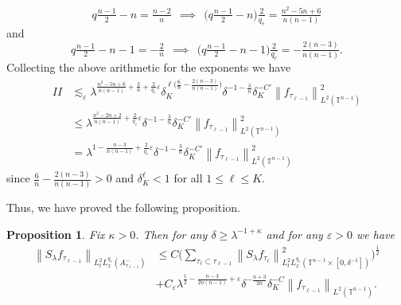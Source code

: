 \documentclass[11pt]{amsart}
\numberwithin{equation}{section}
\newcommand{\Tn}{\mathbb{T}^{n-1}}
\newcommand{\la}{\lambda}
\newcommand\norm[1]{\left\lVert#1\right\rVert}
\newcommand{\lpnorm}[3]{\norm{#1}_{L^{#2}(#3)}}
\newcommand{\mixlpnorm}[4]{\norm{#1}_{L^{#2}_{t} L^{#3}_{x}(#4)}}
\newcommand{\T}[1][]{\mathbb{T}^#1}
\newcommand{\Sl}{S_{\la}}
\newcommand{\dK}[1]{\delta_{K}^{#1}}
\newtheorem{proposition}{Proposition}[section]
\begin{document}
\begin{equation*}
    q\tfrac{n-1}{2} - n = \tfrac{n-2}{n} \ \ \implies \ \ \Big(q \tfrac{n-1}{2} - n\Big)\tfrac{2}{q_e} =  \tfrac{n^2 - 5n + 6}{n(n-1)}
\end{equation*}
and 
\begin{equation*}
    q\tfrac{n-1}{2} - n - 1 = -\tfrac{2}{n} \ \ \implies \ \ \big(q \tfrac{n-1}{2} - n - 1\big)\tfrac{2}{q_e} =  -\tfrac{2(n-3)}{n(n-1)}.
\end{equation*}
\noindent 
Collecting the above arithmetic for the exponents  we have
\begin{equation}
    \begin{split}
        II &\lesssim_{\varepsilon} \la^{\frac{n^2 - 5n + 6}{n(n-1)} + \frac{3}{n} + \frac{2}{q_e}\varepsilon}\dK{\ell\big( \frac{6}{n} - \frac{2(n-3)}{n(n-1)}\big)}\delta^{-1 - \frac{3}{n}}\dK{-C'} \lpnorm{f_{\tau_{\ell - 1}}}{2}{\T{n-1}}^2 \\
        &\leq \la^{\frac{n^2 - 2n + 2}{n(n-1)} + \frac{2}{q_e}\varepsilon} \delta^{-1 - \frac{3}{n}}\dK{-C'} \lpnorm{f_{\tau_{\ell - 1}}}{2}{\T{n-1}}^2 \\
        &= \la^{1 - \frac{n - 3}{n(n-1)} + \frac{2}{q_e}\varepsilon} \delta^{-1 - \frac{3}{n}}\dK{-C'} \lpnorm{f_{\tau_{\ell - 1}}}{2}{\T{n-1}}^2
    \end{split}
\end{equation}
since $\frac{6}{n} - \frac{2(n-3)}{n(n-1)} > 0$ and $\dK{\ell} < 1$ for all $1\leq \ell \leq K$.

Thus, we have proved the following proposition.
\begin{proposition}
    Fix $\kappa > 0$. Then for any $\delta \geq \la^{-1 + \kappa}$ and for any $\varepsilon  > 0$ we have
    \begin{equation}
    \begin{split}
        \mixlpnorm{\Sl f_{\tau_{\ell - 1}}}{2}{q_e}{A^{-}_{\tau_{\ell - 1}}} &\leq C\Big(\sum_{\tau_{\ell} \subset \tau_{\ell - 1}}\mixlpnorm{\Sl f_{\tau_{\ell}}}{2}{q_e}{\Tn \times [0, \delta^{-1}]}^2\Big)^{\frac{1}{2}} \\
        &+ C_{\varepsilon}\la^{\frac{1}{2} - \frac{n-3}{2n(n-1)}+\varepsilon}\delta^{-\frac{n+3}{2n}}\dK{-C}\lpnorm{f_{\tau_{\ell - 1}}}{2}{\Tn}.
    \end{split}
    \end{equation}
\end{proposition}
\end{document}
